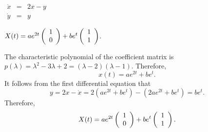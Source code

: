 \documentclass{ximera}
\begin{document}
\begin{exercise} \label{c12.3.4d}
$\begin{array}{rcl}
\dot{x} & = & 2x-y\\
\dot{y} & = & y
\end{array}$

\begin{solution}
\ans $X(t) = ae^{2t}\left(\begin{array}{r} 1 \\ 0\end{array}\right) + be^t\left(\begin{array}{r} 1 \\ 1\end{array}\right)$.

\soln  The characteristic polynomial of the coefficient matrix is 
$p(\lambda) = \lambda^2-3\lambda+2=(\lambda-2)(\lambda-1)$.  Therefore, 
\[
x(t) = ae^{2t}+be^t.
\]
It follows from the first differential equation that 
\[
y = 2x-\dot{x} = 2(ae^{2t}+be^t)-(2ae^{2t}+be^t) = be^t.
\]
Therefore,
\[
X(t) = ae^{2t}\left(\begin{array}{r} 1 \\ 0\end{array}\right) + be^t\left(\begin{array}{r} 1 \\ 1\end{array}\right).
\]


\end{solution}
\end{exercise}

\CEXER
\end{document}
